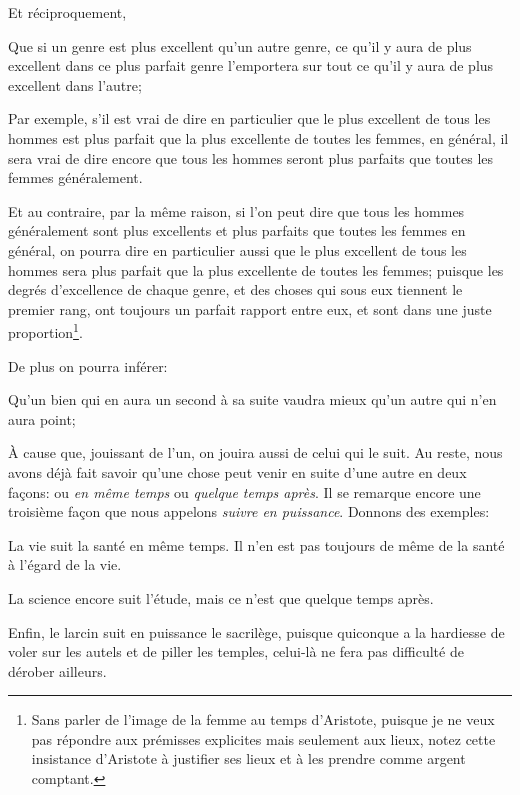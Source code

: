Et réciproquement, 
\begin{lieu}
	Que si un genre est plus excellent qu'un autre genre, ce qu'il y aura de plus excellent dans ce plus parfait genre
	l'emportera sur tout ce qu'il y aura de plus excellent dans l'autre;
\end{lieu}

Par exemple, s'il est vrai de dire en particulier que le plus excellent de tous les hommes est plus parfait que la plus
excellente de toutes les femmes, en général, il sera vrai de dire encore que tous les hommes seront plus parfaits que
toutes les femmes généralement. 

Et au contraire, par la même raison, si l'on peut dire que tous les hommes généralement sont plus excellents et plus parfaits
que toutes les femmes en général, on pourra dire en particulier aussi que le plus excellent de tous les hommes sera plus
parfait que la plus excellente de toutes les femmes; puisque les degrés d'excellence de chaque genre, et des choses qui sous
eux tiennent le premier rang, ont toujours un parfait rapport entre eux, et sont dans une juste proportion\footnote{Sans parler
de l'image de la femme au temps d'Aristote, puisque je ne veux pas répondre aux prémisses explicites mais seulement aux lieux,
notez cette insistance d'Aristote à justifier ses lieux et à les prendre comme argent comptant.}.

\bigbreak 

De plus on pourra inférer:

\begin{lieu}
	Qu'un bien qui en aura un second à sa suite vaudra mieux qu'un autre qui n'en aura point;
\end{lieu}

À cause que, jouissant de l'un, on jouira aussi de celui qui le suit. Au reste, nous avons déjà fait
savoir qu'une chose peut venir en suite d'une autre en deux façons: ou \emph{en même temps} ou \emph{
quelque temps après}. Il se remarque encore une troisième façon que nous appelons \emph{suivre en 
puissance}. Donnons des exemples:

La vie suit la santé en même temps. Il n'en est pas toujours de même de la santé à l'égard de la vie.

La science encore suit l’étude, mais ce n'est que quelque temps après.

Enfin, le larcin suit en puissance le sacrilège, puisque quiconque a la hardiesse de voler sur les autels
et de piller les temples, celui-là ne fera pas difficulté de dérober ailleurs.

